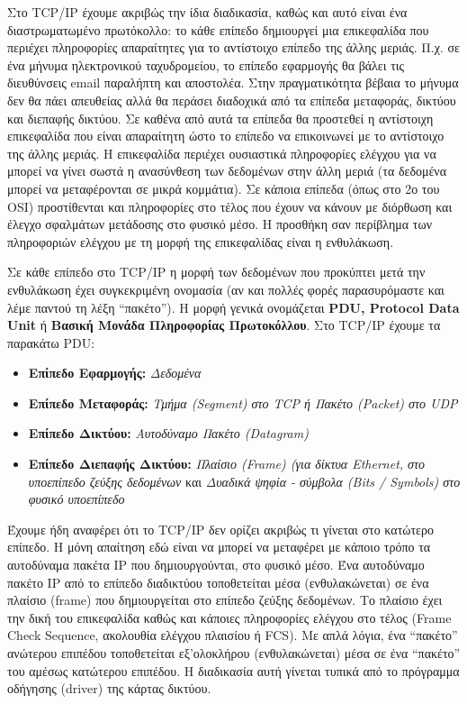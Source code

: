 Στο TCP/IP έχουμε ακριβώς την ίδια διαδικασία, καθώς και αυτό είναι ένα διαστρωματωμένο πρωτόκολλο: το κάθε επίπεδο δημιουργεί μια επικεφαλίδα που περιέχει πληροφορίες απαραίτητες για το αντίστοιχο επίπεδο της άλλης μεριάς. Π.χ. σε ένα μήνυμα ηλεκτρονικού ταχυδρομείου, το επίπεδο εφαρμογής θα βάλει τις διευθύνσεις email παραλήπτη και αποστολέα. Στην πραγματικότητα βέβαια το μήνυμα δεν θα πάει απευθείας αλλά θα περάσει διαδοχικά από τα επίπεδα μεταφοράς, δικτύου και διεπαφής δικτύου. Σε καθένα από αυτά τα επίπεδα θα προστεθεί η αντίστοιχη επικεφαλίδα που είναι απαραίτητη ώστο το επίπεδο να επικοινωνεί με το αντίστοιχο της άλλης μεριάς. Η επικεφαλίδα περιέχει ουσιαστικά πληροφορίες ελέγχου για να μπορεί να γίνει σωστά η ανασύνθεση των δεδομένων στην άλλη μεριά (τα δεδομένα μπορεί να μεταφέρονται σε μικρά κομμάτια). Σε κάποια επίπεδα (όπως στο 2ο του OSI) προστίθενται και πληροφορίες στο τέλος που έχουν να κάνουν με διόρθωση και έλεγχο σφαλμάτων μετάδοσης στο φυσικό μέσο. Η προσθήκη σαν περίβλημα των πληροφοριών ελέγχου με τη μορφή της επικεφαλίδας είναι η ενθυλάκωση.

Σε κάθε επίπεδο στο TCP/IP η μορφή των δεδομένων που προκύπτει μετά την ενθυλάκωση έχει συγκεκριμένη ονομασία (αν και πολλές φορές παρασυρόμαστε και λέμε παντού τη λέξη ``πακέτο''). Η μορφή γενικά ονομάζεται \textbf{PDU, Protocol Data Unit} ή \textbf{Βασική Μονάδα Πληροφορίας Πρωτοκόλλου}. Στο TCP/IP έχουμε τα παρακάτω PDU:

\begin{itemize}
\item \textbf{Επίπεδο Εφαρμογής:} \emph{Δεδομένα}
\item \textbf{Επίπεδο Μεταφοράς:} \emph{Τμήμα (Segment) στο TCP ή Πακέτο (Packet) στο UDP}
\item \textbf{Επίπεδο Δικτύου:} \emph{Αυτοδύναμο Πακέτο (Datagram)}
\item \textbf{Επίπεδο Διεπαφής Δικτύου:} \emph{Πλαίσιο (Frame) (για δίκτυα Ethernet, στο υποεπίπεδο ζεύξης δεδομένων} και \emph{Δυαδικά ψηφία - σύμβολα (Bits / Symbols) στο φυσικό υποεπίπεδο}
\end{itemize}

Έχουμε ήδη αναφέρει ότι το TCP/IP δεν ορίζει ακριβώς τι γίνεται στο κατώτερο επίπεδο. Η μόνη απαίτηση εδώ είναι να μπορεί να μεταφέρει με κάποιο τρόπο τα αυτοδύναμα πακέτα IP που δημιουργούνται, στο φυσικό μέσο. Ένα αυτοδύναμο πακέτο IP από το επίπεδο διαδικτύου τοποθετείται μέσα (ενθυλακώνεται) σε ένα πλαίσιο (frame) που δημιουργείται στο επίπεδο ζεύξης δεδομένων. Το πλαίσιο έχει την δική του επικεφαλίδα καθώς και κάποιες πληροφορίες ελέγχου στο τέλος (Frame Check Sequence, ακολουθία ελέγχου πλαισίου ή FCS). Με απλά λόγια, ένα ``πακέτο'' ανώτερου επιπέδου τοποθετείται εξ'ολοκλήρου (ενθυλακώνεται) μέσα σε ένα ``πακέτο'' του αμέσως κατώτερου επιπέδου. Η διαδικασία αυτή γίνεται τυπικά από το πρόγραμμα οδήγησης (driver) της κάρτας δικτύου.

